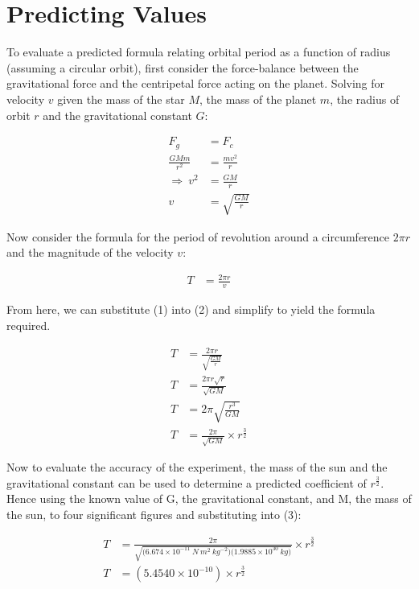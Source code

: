 \documentclass[12pt]{article}
\begin{document}
\pagebreak
\section{Predicting Values}

To evaluate a predicted formula relating orbital period as a function of radius (assuming a circular orbit), first consider the force-balance between the gravitational force and the centripetal force acting on the planet.  Solving for velocity $v$ given the mass of the star $M$,  the mass of the planet $m$, the radius of orbit $r$ and the gravitational constant $G$:

\begin{align}
F_g &= F_c \nonumber \\ 
\frac{GMm}{r^2} &= \frac{mv^2}{r} \nonumber \\ 
\Rightarrow \ v^2 &= \frac{GM}{r} \nonumber \\
v &= \sqrt{\frac{GM}{r}} 
\end{align}

Now consider the formula for the period of revolution around a circumference $2 \pi r$ and the magnitude of the velocity $v$:
 
 \begin{align}
 T &= \frac{2 \pi r}{v} 
 \end{align}

From here, we can substitute (1) into (2) and simplify to yield the formula required. 

 \begin{align}
 T &= \frac{2 \pi r}{\sqrt{\frac{GM}{r}}} \nonumber \\
 T &= \frac{2 \pi r \sqrt{r}}{\sqrt{GM}} \nonumber \\
 T &= 2 \pi \sqrt{\frac{r^3}{GM}} \nonumber \\
 T &= \frac{2 \pi}{\sqrt{GM}} \times  r^{\frac{3}{2}}
\end{align}

Now to evaluate the accuracy of the experiment, the mass of the sun and the gravitational constant can be used to determine a predicted coefficient of $r^\frac{3}{2}$.  Hence using the known value of G, the gravitational constant,  and M, the mass of the sun, to four significant figures and substituting into (3):

 \begin{align*}
 T &= \frac{2 \pi}{\sqrt{ \big( 6.674 \times 10^{-11}\ N\ m^2\ kg^{-2} \big) \big( 	1.9885 \times 10^{30} \ kg \big) }} \times  r^{\frac{3}{2}} \\
 T &= (5.4540 \times 10^{-10}) \times  r^{\frac{3}{2}}
\end{align*}
\end{document}
